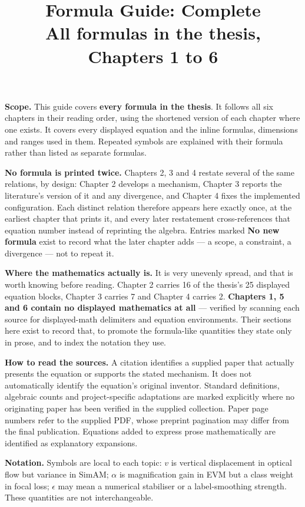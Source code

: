 \documentclass[11pt,a4paper]{article}
\title{Formula Guide: Complete\\\large All formulas in the thesis, Chapters 1 to 6}
\author{}
\date{}
\numberwithin{equation}{section}
\begin{document}
\maketitle

\textbf{Scope.} This guide covers \textbf{every formula in the thesis}. It
follows all six chapters in their reading order, using the shortened version of
each chapter where one exists. It covers every displayed equation and the inline
formulas, dimensions and ranges used in them. Repeated symbols are explained
with their formula rather than listed as separate formulas.

\textbf{No formula is printed twice.} Chapters 2, 3 and 4 restate several of
the same relations, by design: Chapter 2 develops a mechanism, Chapter 3
reports the literature's version of it and any divergence, and Chapter 4 fixes
the implemented configuration. Each distinct relation therefore appears here
exactly once, at the earliest chapter that prints it, and every later
restatement cross-references that equation number instead of reprinting the
algebra. Entries marked \textbf{No new formula} exist to record what the later
chapter adds --- a scope, a constraint, a divergence --- not to repeat it.

\textbf{Where the mathematics actually is.} It is very unevenly spread, and
that is worth knowing before reading. Chapter 2 carries 16 of the thesis's 25
displayed equation blocks, Chapter 3 carries 7 and Chapter 4 carries 2.
\textbf{Chapters 1, 5 and 6 contain no displayed mathematics at all} --- verified
by scanning each source for displayed-math delimiters and equation
environments. Their sections here exist to record that, to promote the
formula-like quantities they state only in prose, and to index the notation
they use.

\textbf{How to read the sources.} A citation identifies a supplied paper that
actually presents the equation or supports the stated mechanism. It does not
automatically identify the equation's original inventor. Standard definitions,
algebraic counts and project-specific adaptations are marked explicitly where
no originating paper has been verified in the supplied collection. Paper page
numbers refer to the supplied PDF, whose preprint pagination may differ from
the final publication. Equations added to express prose mathematically are
identified as explanatory expansions.

\textbf{Notation.} Symbols are local to each topic: $v$ is vertical displacement
in optical flow but variance in SimAM; $\alpha$ is magnification gain in EVM but
a class weight in focal loss; $\epsilon$ may mean a numerical stabiliser or a
label-smoothing strength. These quantities are not interchangeable.
\end{document}
